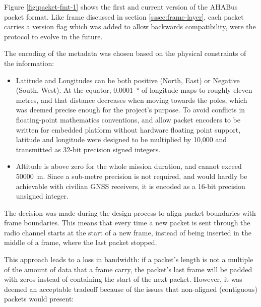 Figure \ref{fig:packet-fmt-1} shows the first and current version of the AHABus
packet format. Like frame discussed in section \ref{sssec:frame-layer}, each
packet carries a version flag which was added to allow backwards compatibility,
were the protocol to evolve in the future.

The encoding of the metadata was chosen based on the physical constraints of
the information:

\begin{itemize}
\item Latitude and Longitudes can be both positive (North, East) or Negative
(South, West). At the equator, \SI{0.0001}{\degree} of longitude maps to
roughly eleven metres\footnotemark , and that distance decreases when moving
towards the poles, which was deemed precise enough for the project's purpose.
To avoid conflicts in floating-point mathematics conventions, and allow packet
encoders to be written for embedded platform without hardware floating point
support, latitude and longitude were designed to be multiplied by 10,000 and
transmitted as 32-bit precision signed integers.

\item Altitude is above zero for the whole mission duration, and cannot exceed
\SI{50000}{\meter}. Since a sub-metre precision is not required, and would
hardly be achievable with civilian GNSS receivers, it is encoded as a 16-bit
precision unsigned integer.

\end{itemize}


The decision was made during the design process to align packet boundaries with
frame boundaries. This means that every time a new packet is sent through the
radio channel starts at the start of a new frame, instead of being inserted
in the middle of a frame, where the last packet stopped.

This approach leads to a loss in bandwidth: if a packet's length is not a 
multiple of the amount of data that a frame carry, the packet's last frame
will be padded with zeros instead of containing the start of the next packet.
However, it was deemed an acceptable tradeoff because of the issues that
non-aligned (contiguous) packets would present:

